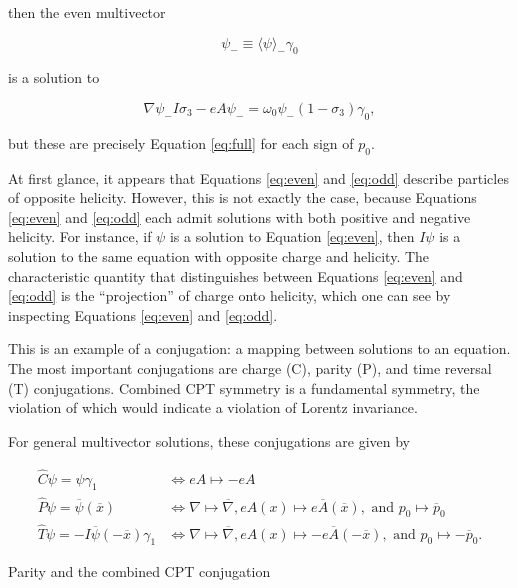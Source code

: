 \documentclass{article}
\begin{document}
  then the even multivector 

  \begin{equation}
    \psi_- \equiv \langle \psi \rangle_- \gamma_0\label{eq:0decomposition}
  \end{equation} 

  is a solution to

  \begin{equation}
    \nabla \psi_- I \sigma_3 - e A \psi_- = \omega_0 \psi_- (1 - \sigma_3) \gamma_0,\label{eq:odd}
  \end{equation}

  but these are precisely Equation \ref{eq:full} for each sign of $p_0$.

  At first glance, it appears that Equations \ref{eq:even} and \ref{eq:odd} describe particles of opposite helicity. However, this is not exactly the case, because Equations \ref{eq:even} and \ref{eq:odd} each admit solutions with both positive and negative helicity. For instance, if $\psi$ is a solution to Equation \ref{eq:even}, then $I \psi$ is a solution to the same equation with opposite charge and helicity. The characteristic quantity that distinguishes between Equations \ref{eq:even} and \ref{eq:odd} is the ``projection'' of charge onto helicity, which one can see by inspecting Equations \ref{eq:even} and \ref{eq:odd}.

  This is an example of a conjugation: a mapping between solutions to an equation. The most important conjugations are charge (C), parity (P), and time reversal (T) conjugations. Combined CPT symmetry is a fundamental symmetry, the violation of which would indicate a violation of Lorentz invariance.

  For general multivector solutions, these conjugations are given by

  \begin{align}
    \hat C \psi = \psi \gamma_1 &\iff eA \mapsto - eA \label{eq:charge}\\
    \hat P \psi = \overline \psi(\overline x) &\iff \nabla \mapsto \overline \nabla, eA(x) \mapsto e\overline A(\overline x), \text{ and } p_0 \mapsto \overline p_0 \label{eq:parity}\\
    \hat T \psi = -I \overline \psi(-\overline x) \gamma_1 &\iff \nabla \mapsto \overline\nabla, eA(x) \mapsto -e\overline A(-\overline x), \text{ and } p_0 \mapsto - \overline p_0.\label{eq:time}
  \end{align}

  Parity and the combined CPT conjugation
\end{document}
